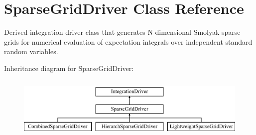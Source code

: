 \section{Sparse\+Grid\+Driver Class Reference}
\label{classPecos_1_1SparseGridDriver}


Derived integration driver class that generates N-\/dimensional Smolyak sparse grids for numerical evaluation of expectation integrals over independent standard random variables.  


Inheritance diagram for Sparse\+Grid\+Driver\+:\begin{figure}[H]
\begin{center}
\leavevmode
\includegraphics[height=3.000000cm]{classPecos_1_1SparseGridDriver}
\end{center}
\end{figure}
